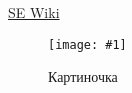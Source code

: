 \documentclass[12pt]{article}
\newcommand{\javacode}[1]{
  \lstset{style=java-style}
  
}
\newcommand{\xmlcode}[1]{
  \lstset{style=xml-style}
  
}
\newcommand{\image}[2]{
\begin{figure}[h!]
 \centering
  \texttt{[image: \#1]}
 \caption{#2}
\end{figure}
}
\begin{document}
\href{http://mit.spbau.ru/sewiki/index.php/SE_Wiki}{SE Wiki}

\image{example/studio_example.png}{Картиночка}

\javacode{example/example.java}

\pagebreak

\xmlcode{example/example.xml}
\end{document}
